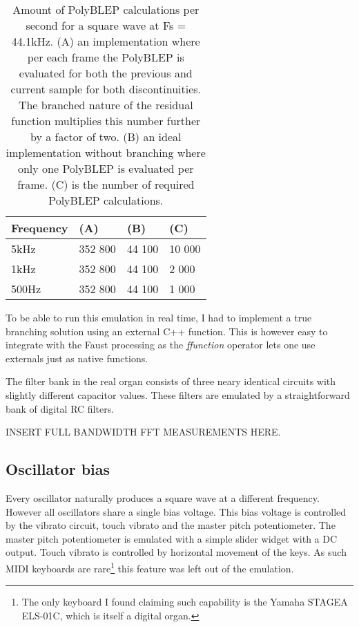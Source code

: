 \documentclass[11pt,a4paper]{article}
\begin{document}
\begin{table}[h]
 \begin{center}
\begin{tabular}{|l|l|l|l|}

      \hline
      Frequency & (A)        &  (B)         & (C) \\
      \hline\hline
      5kHz     & 352 800     & 44 100       & 10 000\\
      1kHz     & 352 800     & 44 100       &  2 000\\
      500Hz    & 352 800     & 44 100       &  1 000\\
      \hline

\end{tabular}
\caption{Amount of PolyBLEP calculations per second for a square wave at Fs = 44.1kHz. 
(A) an implementation where per each frame the PolyBLEP is evaluated for both the previous and current sample for both discontinuities. The branched nature of the residual function multiplies this number further by a factor of two.
(B) an ideal implementation without branching where only one PolyBLEP is evaluated per frame.
(C) is the number of required PolyBLEP calculations.  }\label{table:polyblep-amount}
 \end{center}
\end{table}

To be able to run this emulation in real time, I had to implement a true branching solution using an external C++ function. This is however easy to integrate with the Faust processing as the \emph{ffunction} operator lets one use externals just as native functions.

The filter bank in the real organ consists of three neary identical circuits with slightly different capacitor values. These filters are emulated by a straightforward bank of digital RC filters.

INSERT FULL BANDWIDTH FFT MEASUREMENTS HERE.

\subsection{Oscillator bias}
\label{section:oscillator-bias}

Every oscillator naturally produces a square wave at a different frequency. However all oscillators share a single bias voltage. This bias voltage is controlled by the vibrato circuit, touch vibrato and the master pitch potentiometer. The master pitch potentiometer is emulated with a simple slider widget with a DC output. Touch vibrato is controlled by horizontal movement of the keys. As such MIDI keyboards are rare\footnote{The only keyboard I found claiming such capability is the Yamaha STAGEA ELS-01C, which is itself a digital organ.} this feature was left out of the emulation.
\end{document}
